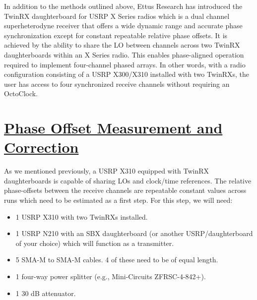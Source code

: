 \documentclass[a4paper, 11pt]{article}
\begin{document}
In addition to the methods outlined above, Ettus Research has introduced the TwinRX daughterboard for USRP X Series radios which is a dual channel superheterodyne receiver that offers a wide dynamic range and accurate phase synchronization except for constant repeatable relative phase offsets. It is achieved by the ability to share the LO between channels across two TwinRX daughterboards within an X Series radio. This enables phase-aligned operation required to implement four-channel phased arrays. In other words, with a radio configuration consisting of a USRP X300/X310 installed with two TwinRXs, the user has access to four synchronized receive channels without requiring an OctoClock. 

\section*{\underline{Phase Offset Measurement and Correction}}
As we mentioned previously, a USRP X310 equipped with TwinRX daughterboards is capable of sharing LOs and clock/time references. The relative phase-offsets between the receive channels are repeatable constant values across runs which need to be estimated as a first step. For this step, we will need:
\begin{itemize}
\item 1 USRP X310 with two TwinRXs installed.
\item 1 USRP N210 with an SBX daughterboard (or another USRP/daughterboard of your choice) which will function as a transmitter\footnotemark{}.
\item 5 SMA-M to SMA-M cables. 4 of these need to be of equal length.
\item 1 four-way power splitter (e.g., Mini-Circuits ZFRSC-4-842+).
\item 1 30 dB attenuator.
\end{itemize}
\end{document}
